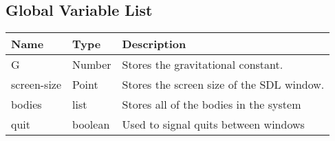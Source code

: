 \subsection{Global Variable List}
\begin{tabular}{p{}p{}p{}}
	Name & Type & Description \\ \hline
	G & Number & Stores the gravitational constant.\\
	screen-size & Point & Stores the screen size of the SDL window. \\
	bodies & list & Stores all of the bodies in the system \\
	quit & boolean & Used to signal quits between windows \\
\end{tabular}

